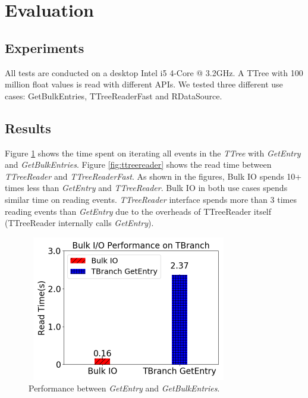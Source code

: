 \section{Evaluation}
\label{sec:evaluation}

\subsection{Experiments}

All tests are conducted on a desktop Intel i5 4-Core @ 3.2GHz. A TTree with 100 million float values is read with different APIs. We tested three different use cases: GetBulkEntries, TTreeReaderFast and RDataSource.

\subsection{Results}

Figure \ref{fig:tbranch} shows the time spent on iterating all events in the \textit{TTree} with \textit{GetEntry} and \textit{GetBulkEntries}. Figure \ref{fig:ttreereader} shows the read time between \textit{TTreeReader} and \textit{TTreeReaderFast}. As shown in the figures, Bulk IO spends 10+ times less than \textit{GetEntry} and \textit{TTreeReader}. Bulk IO in both use cases spends similar time on reading events. \textit{TTreeReader} interface spends more than 3 times reading events than \textit{GetEntry} due to the overheads of TTreeReader itself (TTreeReader internally calls \textit{GetEntry}). 

\begin{figure}[!ht]
\centering
\includegraphics[height=2.5in, width=3.5in]{getbulkentries.png}
\vspace*{-2mm}
\caption{Performance between \textit{GetEntry} and \textit{GetBulkEntries}.}
\label{fig:tbranch}
\end{figure}


